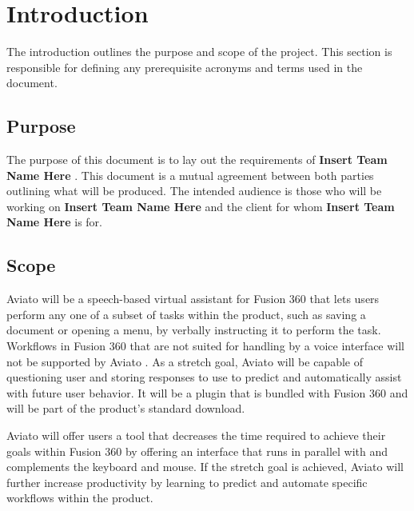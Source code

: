 \documentclass[onecolumn, draftclsnofoot,10pt, compsoc]{IEEEtran}
\def \CapstoneTeamName{\textbf{Insert Team Name Here} }
\def \botname{Aviato }
\begin{document}
\section{Introduction}
        The introduction outlines the purpose and scope of the project. 
        This section is responsible for defining any prerequisite acronyms and terms used in the document. 
    \subsection{Purpose}
        The purpose of this document is to lay out the requirements of \CapstoneTeamName. 
        This document is a mutual agreement between both parties outlining what will be produced. 
        The intended audience is those who will be working on \CapstoneTeamName and the client for whom \CapstoneTeamName is for.
    \subsection{Scope}
        \botname will be a speech-based virtual assistant for Fusion 360 that lets users perform any one of a subset of tasks within the product, such as saving a document or opening a menu, by verbally instructing it to perform the task.
        Workflows in Fusion 360 that are not suited for handling by a voice interface will not be supported by \botname.
        As a stretch goal, \botname will be capable of questioning user and storing responses to use to predict and automatically assist with future user behavior.
        It will be a plugin that is bundled with Fusion 360 and will be part of the product's standard download.

        \botname will offer users a tool that decreases the time required to achieve their goals within Fusion 360 by offering an interface that runs in parallel with and complements the keyboard and mouse.
        If the stretch goal is achieved, \botname will further increase productivity by learning to predict and automate specific workflows within the product.
        
\end{document}

